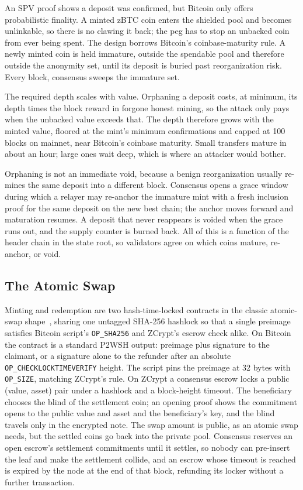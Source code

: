 \documentclass[twocolumn,10pt]{article}
\begin{document}
An SPV proof shows a deposit was confirmed, but Bitcoin only offers probabilistic finality. A minted zBTC coin enters the shielded pool and becomes unlinkable, so there is no clawing it back; the peg has to stop an unbacked coin from ever being spent. The design borrows Bitcoin's coinbase-maturity rule. A newly minted coin is held immature, outside the spendable pool and therefore outside the anonymity set, until its deposit is buried past reorganization risk. Every block, consensus sweeps the immature set.

The required depth scales with value. Orphaning a deposit costs, at minimum, its depth times the block reward in forgone honest mining, so the attack only pays when the unbacked value exceeds that. The depth therefore grows with the minted value, floored at the mint's minimum confirmations and capped at 100 blocks on mainnet, near Bitcoin's coinbase maturity. Small transfers mature in about an hour; large ones wait deep, which is where an attacker would bother.

Orphaning is not an immediate void, because a benign reorganization usually re-mines the same deposit into a different block. Consensus opens a grace window during which a relayer may re-anchor the immature mint with a fresh inclusion proof for the same deposit on the new best chain; the anchor moves forward and maturation resumes. A deposit that never reappears is voided when the grace runs out, and the supply counter is burned back. All of this is a function of the header chain in the state root, so validators agree on which coins mature, re-anchor, or void.

\subsection{The Atomic Swap}

Minting and redemption are two hash-time-locked contracts in the classic atomic-swap shape~\cite{tiernolan}, sharing one untagged SHA-256 hashlock so that a single preimage satisfies Bitcoin script's \texttt{OP\_SHA256} and ZCrypt's escrow check alike. On Bitcoin the contract is a standard P2WSH output: preimage plus signature to the claimant, or a signature alone to the refunder after an absolute \texttt{OP\_CHECKLOCKTIMEVERIFY} height. The script pins the preimage at 32 bytes with \texttt{OP\_SIZE}, matching ZCrypt's rule. On ZCrypt a consensus escrow locks a public (value, asset) pair under a hashlock and a block-height timeout. The beneficiary chooses the blind of the settlement coin; an opening proof shows the commitment opens to the public value and asset and the beneficiary's key, and the blind travels only in the encrypted note. The swap amount is public, as an atomic swap needs, but the settled coins go back into the private pool. Consensus reserves an open escrow's settlement commitments until it settles, so nobody can pre-insert the leaf and make the settlement collide, and an escrow whose timeout is reached is expired by the node at the end of that block, refunding its locker without a further transaction.
\end{document}
